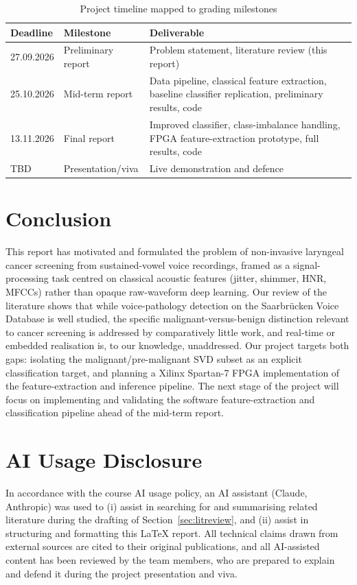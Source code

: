 \documentclass[conference]{IEEEtran}
\begin{document}
\begin{table}[h]
\centering
\caption{Project timeline mapped to grading milestones}
\label{tab:timeline}
\begin{tabular}{@{}p{2.1cm}p{2.0cm}p{3.4cm}@{}}
\toprule
\textbf{Deadline} & \textbf{Milestone} & \textbf{Deliverable} \\
\midrule
27.09.2026 & Preliminary report & Problem statement, literature review (this report) \\
25.10.2026 & Mid-term report & Data pipeline, classical feature extraction, baseline classifier replication, preliminary results, code \\
13.11.2026 & Final report & Improved classifier, class-imbalance handling, FPGA feature-extraction prototype, full results, code \\
TBD & Presentation/viva & Live demonstration and defence \\
\bottomrule
\end{tabular}
\end{table}

\section{Conclusion}
\label{sec:conclusion}
This report has motivated and formulated the problem of non-invasive laryngeal cancer screening from sustained-vowel voice recordings, framed as a signal-processing task centred on classical acoustic features (jitter, shimmer, HNR, MFCCs) rather than opaque raw-waveform deep learning. Our review of the literature shows that while voice-pathology detection on the Saarbr\"ucken Voice Database is well studied, the specific malignant-versus-benign distinction relevant to cancer screening is addressed by comparatively little work, and real-time or embedded realisation is, to our knowledge, unaddressed. Our project targets both gaps: isolating the malignant/pre-malignant SVD subset as an explicit classification target, and planning a Xilinx Spartan-7 FPGA implementation of the feature-extraction and inference pipeline. The next stage of the project will focus on implementing and validating the software feature-extraction and classification pipeline ahead of the mid-term report.

\section*{AI Usage Disclosure}
In accordance with the course AI usage policy, an AI assistant (Claude, Anthropic) was used to (i) assist in searching for and summarising related literature during the drafting of Section~\ref{sec:litreview}, and (ii) assist in structuring and formatting this LaTeX report. All technical claims drawn from external sources are cited to their original publications, and all AI-assisted content has been reviewed by the team members, who are prepared to explain and defend it during the project presentation and viva.
\end{document}
